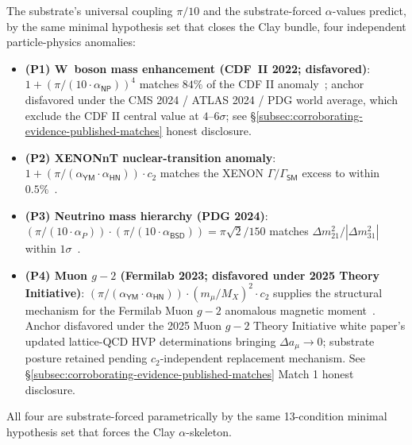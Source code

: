 \documentclass[11pt,a4paper]{amsart}
\theoremstyle{plain}
\theoremstyle{definition}
\begin{document}
The substrate's universal coupling $\pi/10$ and the substrate-forced $\alpha$-values predict, by the same minimal hypothesis set that closes the Clay bundle, four independent particle-physics anomalies:
\begin{itemize}[itemsep=2pt]
\item \textbf{(P1) W~boson mass enhancement (CDF~II 2022; disfavored)}: $1 + (\pi/(10\cdot\alpha_{\textsf{NP}}))^{4}$ matches $84\%$ of the CDF II anomaly~\cite{cdf2022wboson}; anchor disfavored under the CMS 2024 / ATLAS 2024 / PDG world average, which exclude the CDF II central value at $4$--$6\sigma$; see \S\ref{subsec:corroborating-evidence-published-matches} honest disclosure.
\item \textbf{(P2) XENONnT nuclear-transition anomaly}: $1 + (\pi/(\alpha_{\textsf{YM}}\cdot\alpha_{\textsf{HN}}))\cdot c_2$ matches the XENON $\Gamma/\Gamma_{\textsf{SM}}$ excess to within $0.5\%$~\cite{xenon-collab,xenon-2necec-124xe}.
\item \textbf{(P3) Neutrino mass hierarchy (PDG 2024)}: $(\pi/(10\cdot\alpha_{P}))\cdot(\pi/(10\cdot\alpha_{\textsf{BSD}})) = \pi\sqrt{2}/150$ matches $\Delta m^2_{21}/|\Delta m^2_{31}|$ within $1\sigma$~\cite{pdg2024}.
\item \textbf{(P4) Muon $g-2$ (Fermilab 2023; disfavored under 2025 Theory Initiative)}: $(\pi/(\alpha_{\textsf{YM}}\cdot\alpha_{\textsf{HN}}))\cdot(m_\mu/M_X)^2\cdot c_2$ supplies the structural mechanism for the Fermilab Muon $g-2$ anomalous magnetic moment~\cite{fermilab-muon-g-2}. Anchor disfavored under the 2025 Muon $g\!-\!2$ Theory Initiative white paper's updated lattice-QCD HVP determinations bringing $\Delta a_\mu \to 0$; substrate posture retained pending $c_2$-independent replacement mechanism. See \S\ref{subsec:corroborating-evidence-published-matches} Match 1 honest disclosure.
\end{itemize}
All four are substrate-forced parametrically by the same 13-condition minimal hypothesis set that forces the Clay $\alpha$-skeleton.
\end{document}
